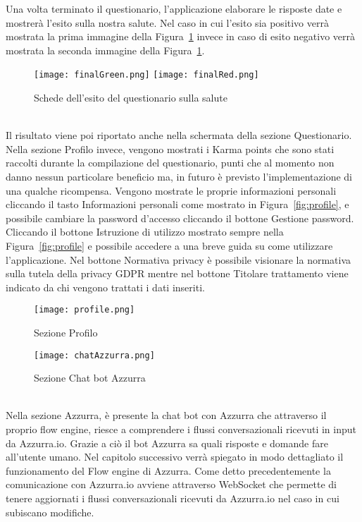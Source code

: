 \begin{trivlist}
	Una volta terminato il questionario, l'applicazione elaborare le risposte date e mostrerà l'esito sulla nostra salute. Nel caso in cui l'esito sia positivo verrà mostrata la prima immagine della Figura~\ref{fig:quefinal} invece in caso di esito negativo verrà mostrata la seconda immagine della Figura~\ref{fig:quefinal}.
	\begin{figure}[h]
		\begin{center}
			\texttt{[image: finalGreen.png]}
			\texttt{[image: finalRed.png]}
			\caption{Schede dell'esito del questionario sulla salute}\label{fig:quefinal}
		\end{center}
	\end{figure}\\
	Il risultato viene poi riportato anche nella schermata della sezione Questionario.
	\\
	Nella sezione Profilo invece, vengono mostrati i Karma points che sono stati raccolti durante la compilazione del questionario, punti che al momento non danno nessun particolare beneficio ma, in futuro è previsto l'implementazione di una qualche ricompensa. Vengono mostrate le proprie informazioni personali cliccando il tasto Informazioni personali come mostrato in Figura~\ref{fig:profile}, e possibile cambiare la password d'accesso cliccando il bottone Gestione password. Cliccando il bottone Istruzione di utilizzo mostrato sempre nella Figura~\ref{fig:profile} e possibile accedere a una breve guida su come utilizzare l'applicazione. Nel bottone Normativa privacy è possibile visionare la normativa sulla tutela della privacy GDPR mentre nel bottone Titolare trattamento viene indicato da chi vengono trattati i dati inseriti.
	\begin{figure}[h]
		\begin{center}
			\texttt{[image: profile.png]}
			\caption{Sezione Profilo}\label{fig:profile}
			\texttt{[image: chatAzzurra.png]}
			\caption{Sezione Chat bot Azzurra}\label{fig:Azzurra}
		\end{center}
	\end{figure}\\
	Nella sezione Azzurra, è presente la chat bot con Azzurra che attraverso il proprio flow engine, riesce a comprendere i flussi conversazionali ricevuti in input da Azzurra.io. Grazie a ciò il bot Azzurra sa quali risposte e domande fare all'utente umano. Nel capitolo successivo verrà spiegato in modo dettagliato il funzionamento del Flow engine di Azzurra. Come detto precedentemente la comunicazione con Azzurra.io avviene attraverso WebSocket che permette di tenere aggiornati i flussi conversazionali ricevuti da Azzurra.io nel caso in cui subiscano modifiche.	
	
\end{trivlist}
